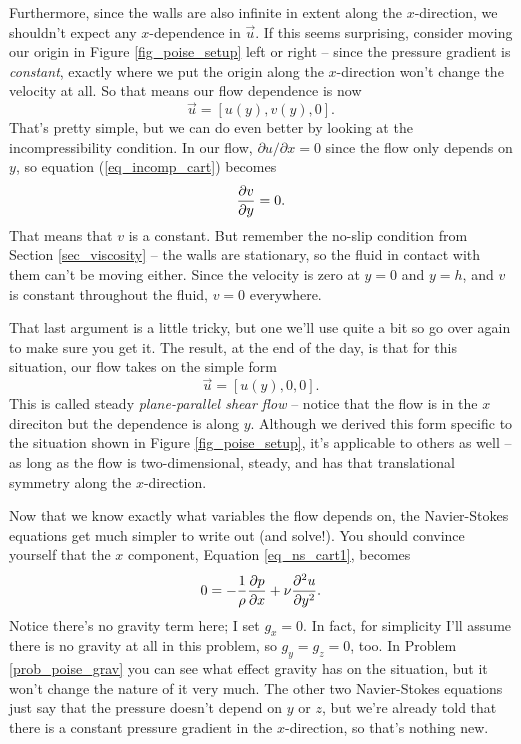 Furthermore, since the walls are also infinite in extent along the $x$-direction, we shouldn't expect any $x$-dependence in $\vec{u}$.  If this seems surprising, consider moving our origin in Figure \ref{fig_poise_setup} left or right -- since the pressure gradient is \emph{constant}, exactly where we put the origin along the $x$-direction won't change the velocity at all.  So that means our flow dependence is now
\[
\vec{u} = [u(y), v(y), 0].
\]
That's pretty simple, but we can do even better by looking at the incompressibility condition.  In our flow, $\partial u /\partial x = 0$ since the flow only depends on $y$, so equation (\ref{eq_incomp_cart}) becomes
\[
\frac{\partial {v}}{\partial {y}} = 0.
\]
That means that $v$ is a constant.  But remember the no-slip condition from Section \ref{sec_viscosity} -- the walls are stationary, so the fluid in contact with them can't be moving either.  Since the velocity is zero at $y=0$ and $y=h$, and $v$ is constant throughout the fluid, $v=0$ everywhere.

That last argument is a little tricky, but one we'll use quite a bit so go over again to make sure you get it.  The result, at the end of the day, is that for this situation, our flow takes on the simple form
\begin{equation}
\vec{u} = [u(y), 0, 0].
\end{equation}
This is called steady \emph{plane-parallel shear flow} -- notice that the flow is in the $x$ direciton but the dependence is along $y$.  Although we derived this form specific to the situation shown in Figure \ref{fig_poise_setup}, it's applicable to others as well -- as long as the flow is two-dimensional, steady, and has that translational symmetry along the $x$-direction.

Now that we know exactly what variables the flow depends on, the Navier-Stokes equations get much simpler to write out (and solve!).  You should convince yourself that the $x$ component, Equation \ref{eq_ns_cart1}, becomes
\begin{equation}
\label{eq_poise_diffeq}
0 = -\frac{1}{\rho} \frac{\partial {p}}{\partial {x}} + \nu \frac{\partial^2 {u}}{\partial {y}^2}.
\end{equation}
Notice there's no gravity term here; I set $g_x = 0$. In fact, for simplicity I'll assume there is no gravity at all in this problem, so $g_y = g_z = 0$, too.  In Problem \ref{prob_poise_grav} you can see what effect gravity has on the situation, but it won't change the nature of it very much.  The other two Navier-Stokes equations just say that the pressure doesn't depend on $y$ or $z$, but we're already told that there is a constant pressure gradient in the $x$-direction, so that's nothing new.

